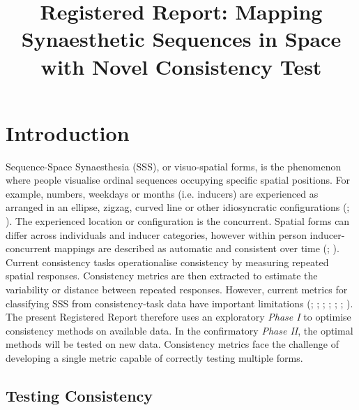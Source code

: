 \documentclass[
  man,
  floatsintext,
  longtable,
  nolmodern,
  notxfonts,
  notimes,
  colorlinks=true,linkcolor=blue,citecolor=blue,urlcolor=blue]{apa7}
\title{Registered Report: Mapping Synaesthetic Sequences in Space with
Novel Consistency Test}
\affiliation{
{Faculty of Psychology, UniDistance Suisse}}
\begin{document}
\maketitle




\setlength\LTleft{0pt}

\resetlinenumber[1]



\section{Introduction}\label{sec-introduction}

Sequence-Space Synaesthesia (SSS), or visuo-spatial forms, is the
phenomenon where people visualise ordinal sequences occupying specific
spatial positions. For example, numbers, weekdays or months (i.e.
inducers) are experienced as arranged in an ellipse, zigzag, curved line
or other idiosyncratic configurations
(;
). The experienced location or
configuration is the concurrent. Spatial forms can differ across
individuals and inducer categories, however within person
inducer-concurrent mappings are described as automatic and consistent
over time (;
). Current consistency tasks
operationalise consistency by measuring repeated spatial responses.
Consistency metrics are then extracted to estimate the variability or
distance between repeated responses. However, current metrics for
classifying SSS from consistency-task data have important limitations
(;
;
;
;
;
; ). The present Registered Report therefore uses an
exploratory \emph{Phase I} to optimise consistency methods on available
data. In the confirmatory \emph{Phase II}, the optimal methods will be
tested on new data. Consistency metrics face the challenge of developing
a single metric capable of correctly testing multiple forms.

\subsection{Testing Consistency}\label{sec-consistency-tests}
\end{document}
